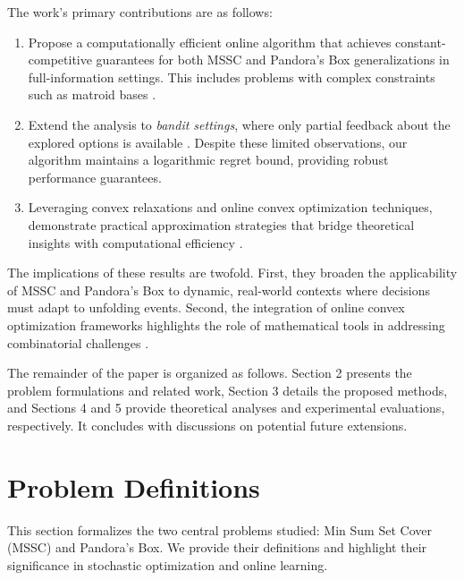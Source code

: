 \documentclass[11pt,a4paper]{article}
\begin{document}
The work's primary contributions are as follows:
\begin{enumerate}
    \item Propose a computationally efficient online algorithm that achieves constant-competitive guarantees for both MSSC and Pandora's Box generalizations in full-information settings. This includes problems with complex constraints such as matroid bases \cite{bansal2010constant}.
    \item Extend the analysis to \textit{bandit settings}, where only partial feedback about the explored options is available \cite{flaxman2004online}. Despite these limited observations, our algorithm maintains a logarithmic regret bound, providing robust performance guarantees.
    \item Leveraging convex relaxations and online convex optimization techniques, demonstrate practical approximation strategies that bridge theoretical insights with computational efficiency \cite{shalev2007primal}.
\end{enumerate}

The implications of these results are twofold. First, they broaden the applicability of MSSC and Pandora's Box to dynamic, real-world contexts where decisions must adapt to unfolding events. Second, the integration of online convex optimization frameworks highlights the role of mathematical tools in addressing combinatorial challenges \cite{gergatsouli2022online}.

The remainder of the paper is organized as follows. Section 2 presents the problem formulations and related work, Section 3 details the proposed methods, and Sections 4 and 5 provide theoretical analyses and experimental evaluations, respectively. It concludes with discussions on potential future extensions.
\pagebreak

\section{Problem Definitions}
This section formalizes the two central problems studied: Min Sum Set Cover (MSSC) and Pandora’s Box. We provide their definitions and highlight their significance in stochastic optimization and online learning.
\end{document}
